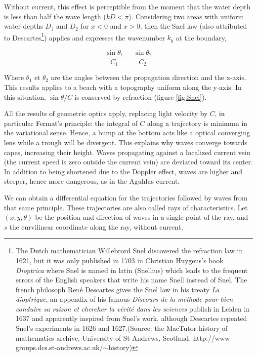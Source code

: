 Without current, this effect is perceptible from the moment that
the water depth is less than half the wave length ($kD<\pi$).
Considering two areas with uniform water depths $D_1$ and
$D_2$ for $x<0$ and $x>0$, then the Snel law (also attributed to
Descartes\footnote{The Dutch mathematician Willebrord Snel discovered
the refraction law in 1621, but it was only published in 1703 in
Christian Huygens's book {\it Dioptrica} where Snel is named
in latin (Snellius) which leads to the frequent errors of the
English speakers that write his name Snell instead of Snel. The french
philosoph Ren{\'e} Descartes gives the Snel law in his treaty {\it La dioptrique},
an appendix of his famous {\it Discours de la m{\'e}thode pour bien conduire sa raison
et chercher la v{\'e}rit{\'e} dans les sciences} publish in Leiden in 1637
and apparently inspired from Snel's work, although Descartes repeated
Snel's experiments in 1626 and 1627.(Source: the
MacTutor history of mathematics archive, University of St Andrews,
Scotland, http://www-groups.dcs.st-andrews.ac.uk/{$\sim$}history)})
applies and expresses the wavenumber $k_y$ at the boundary,

\begin{equation}
    \frac{\sin \theta_1}{C_1}=\frac{\sin \theta_2}{C_2}
\end{equation}


Where $\theta_1$ et $\theta_2$ are the angles between the propagation
direction and the x-axis. This results applies to a beach with a topography
uniform along the y-axis. In this situation, $\sin \theta/C$ is conserved
by refraction  (figure \ref{fig:Snel}).

All the results of geometric optics apply, replacing light velocity by $C$,
in particular Fermat's principle: the integral of $C$ along a trajectory is
minimum in the variational sense. Hence, a bump at the bottom acts like a
optical converging lens while a trough will be divergent. This explains why
waves converge towards capes, increasing their height.
Waves propagating against a localized current vein (the current speed is zero
outside the current vein) are deviated toward its center. In addition to being shortened
due to the Doppler effect, waves are higher and steeper, hence more dangerous,
as in the Aguhlas current.

We can obtain a differential equation for the trajectories followed by waves from
that same principle. These trajectories are also called rays of characteristics.
Let $\left(x,y,\theta\right)$ be the position and direction of waves in a single
point of the ray, and $s$ the curvilinear coordinate along the ray, without current,

